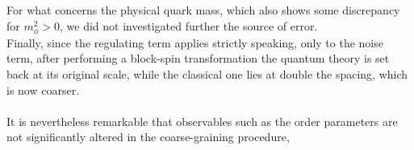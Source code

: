 For what concerns the physical quark mass, which also shows some discrepancy for $m_\phi^2 > 0$, we did not investigated further the source of error. \\
Finally, since the regulating term applies strictly speaking, only to the noise term, after performing a block-spin transformation the quantum theory is set back at its original scale, while the classical one lies at double the spacing, which is now coarser. \\~\\
It is nevertheless remarkable that observables such as the order parameters are not significantly altered in the coarse-graining procedure, 